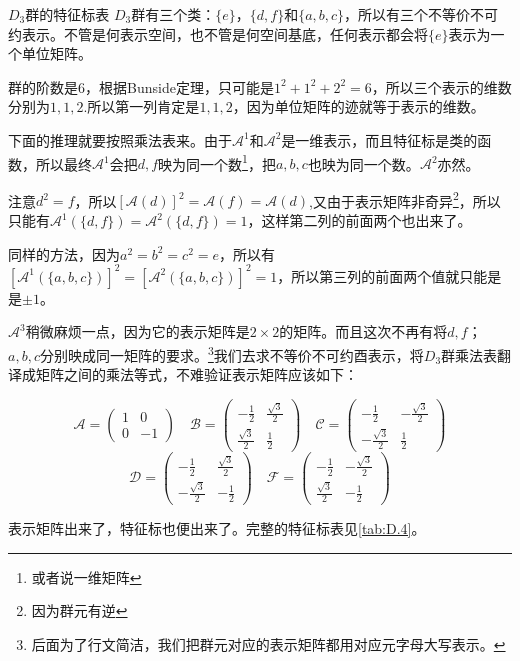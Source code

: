 \begin{example}{$D_3$群的特征标表}
	\setlength\parindent{2em}$D_3$群有三个类：$\{e\}$，$\{d,f\}$和$\{a,b,c\}$，所以有三个不等价不可约表示。不管是何表示空间，也不管是何空间基底，任何表示都会将$\{e\}$表示为一个单位矩阵。
	
	\setlength\parindent{2em}群的阶数是$6$，根据Bunside定理，只可能是$1^2+1^2+2^2=6$，所以三个表示的维数分别为$1,1,2$.所以第一列肯定是$1,1,2$，因为单位矩阵的迹就等于表示的维数。
	
	\setlength\parindent{2em}下面的推理就要按照乘法表来。由于$\mathscr{A}^1$和$\mathscr{A}^2$是一维表示，而且特征标是类的函数，所以最终$\mathscr{A}^1$会把$d,f$映为同一个数\footnote{或者说一维矩阵}，把$a,b,c$也映为同一个数。$\mathscr{A}^2$亦然。
	
	\setlength\parindent{2em}注意$d^2=f$，所以$[\mathcal{A}(d)]^2=\mathcal{A}(f)=\mathcal{A}(d)$,又由于表示矩阵非奇异\footnote{因为群元有逆}，所以只能有$\mathcal{A}^1(\{d,f\})=\mathcal{A}^2(\{d,f\})=1$，这样第二列的前面两个也出来了。
	
	\setlength\parindent{2em}同样的方法，因为$a^2=b^2=c^2=e$，所以有$[\mathcal{A}^1(\{a,b,c\})]^2=[\mathcal{A}^2(\{a,b,c\})]^2=1$，所以第三列的前面两个值就只能是是$\pm 1$。
	
	\setlength\parindent{2em}$\mathscr{A}^3$稍微麻烦一点，因为它的表示矩阵是$2\times 2$的矩阵。而且这次不再有将$d,f$；$a,b,c$分别映成同一矩阵的要求。\footnote{后面为了行文简洁，我们把群元对应的表示矩阵都用对应元字母大写表示。}我们去求不等价不可约酉表示，将$D_3$群乘法表翻译成矩阵之间的乘法等式，不难验证表示矩阵应该如下：

	\[\mathcal{A}=\left(\begin{array}{cc}
		1 & 0 \\
		0 & -1
	\end{array}\right)\quad\mathcal{B}=\left(\begin{array}{cc}
		-\frac{1}{2} & \frac{\sqrt{3}}{2} \\
		\frac{\sqrt{3}}{2} & \frac{1}{2}
	\end{array}\right)\quad\mathcal{C}=\left(\begin{array}{cc}
		-\frac{1}{2} & -\frac{\sqrt{3}}{2} \\
		-\frac{\sqrt{3}}{2} & \frac{1}{2}
	\end{array}\right)\]
	\[\mathcal{D}=\left(\begin{array}{cc}
		-\frac{1}{2} & \frac{\sqrt{3}}{2} \\
		-\frac{\sqrt{3}}{2} & -\frac{1}{2}
	\end{array}\right)\quad\mathcal{F}=\left(\begin{array}{cc}
		-\frac{1}{2} & -\frac{\sqrt{3}}{2} \\
		\frac{\sqrt{3}}{2} & -\frac{1}{2}
	\end{array}\right)\]

	表示矩阵出来了，特征标也便出来了。完整的特征标表见\ref{tab:D.4}。
\end{example}

